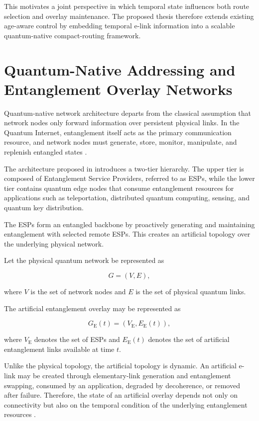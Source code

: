 This motivates a joint perspective in which temporal state influences both route selection and overlay maintenance. The proposed thesis therefore extends existing age-aware control by embedding temporal e-link information into a scalable quantum-native compact-routing framework.
\section{Quantum-Native Addressing and Entanglement Overlay Networks}

Quantum-native network architecture departs from the classical assumption that network nodes only forward information over persistent physical links. In the Quantum Internet, entanglement itself acts as the primary communication resource, and network nodes must generate, store, monitor, manipulate, and replenish entangled states \cite{caleffi2025quantumarchitecture,wehner2018vision}.

The architecture proposed in \cite{caleffi2025quantumarchitecture} introduces a two-tier hierarchy. The upper tier is composed of Entanglement Service Providers, referred to as ESPs, while the lower tier contains quantum edge nodes that consume entanglement resources for applications such as teleportation, distributed quantum computing, sensing, and quantum key distribution.

The ESPs form an entangled backbone by proactively generating and maintaining entanglement with selected remote ESPs. This creates an artificial topology over the underlying physical network.

Let the physical quantum network be represented as

\begin{equation}
    G = (V,E),
\end{equation}

where $V$ is the set of network nodes and $E$ is the set of physical quantum links.

The artificial entanglement overlay may be represented as

\begin{equation}
    G_{\mathrm{E}}(t)
    =
    \left(
    V_{\mathrm{E}},
    E_{\mathrm{E}}(t)
    \right),
\end{equation}

where $V_{\mathrm{E}}$ denotes the set of ESPs and $E_{\mathrm{E}}(t)$ denotes the set of artificial entanglement links available at time $t$.

Unlike the physical topology, the artificial topology is dynamic. An artificial e-link may be created through elementary-link generation and entanglement swapping, consumed by an application, degraded by decoherence, or removed after failure. Therefore, the state of an artificial overlay depends not only on connectivity but also on the temporal condition of the underlying entanglement resources \cite{caleffi2025quantumarchitecture,ercetin2026fidelityage}.

